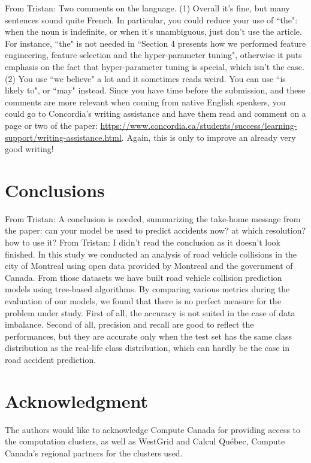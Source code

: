 \documentclass[conference]{IEEEtran}
\newcommand{\TG}[1]{\colorlet{saved}{.}\color{orange}From Tristan: #1\color{saved}}
\begin{document}
\TG{Two comments on the language. (1) Overall it's fine, but many sentences sound 
quite French. In particular, you could reduce your use of ``the": when the noun is indefinite, or when it's unambiguous, just don't use the article.  For instance, ``the" is not needed in ``Section
4 presents how we performed feature engineering, feature
selection and the hyper-parameter tuning", otherwise it puts emphasis on the fact that hyper-parameter tuning is special, which isn't the case. (2) You use ``we believe" a lot and it sometimes reads weird. You can use ``is likely to", or ``may" instead. Since you have time before the submission, and these comments are more relevant when coming from native English speakers, you could go to Concordia's writing assistance and have them read and comment on a page or two of the paper: \url{https://www.concordia.ca/students/success/learning-support/writing-assistance.html}. Again, this is only to improve an already very good writing!}


\section*{Conclusions}

\TG{A conclusion is needed, summarizing the take-home message from the paper:
can your model be used to predict accidents now? at which resolution? how to use it?}
\TG{I didn't read the conclusion as it doesn't look finished.}
In this study we conducted an analysis of road vehicle collisions in the city of Montreal using open data provided by Montreal and the government of Canada. From those datasets we have built road vehicle collision prediction models using tree-based algorithms. By comparing various metrics during the evaluation of our models, we found that there is no perfect measure for the problem under study. 
First of all, the accuracy is not suited in the case of data imbalance. 
Second of all, precision and recall are good to reflect the performances, but they are accurate only when the test set has the same class distribution as the real-life class distribution, which can hardly be the case in road accident prediction. 


\section*{Acknowledgment}

The authors would like to acknowledge Compute Canada for providing access to the computation clusters, as well as WestGrid and Calcul Québec, Compute Canada's regional partners for the clusters used.



\end{document}
